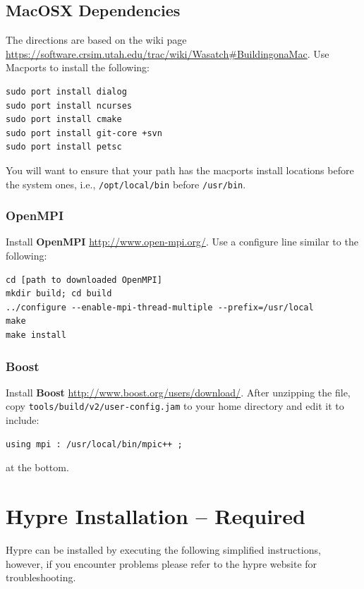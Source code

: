 \documentclass[12pt]{article}
\begin{document}
\subsection{MacOSX  Dependencies}

The directions are based on the wiki page
\url{https://software.crsim.utah.edu/trac/wiki/Wasatch#BuildingonaMac}. Use
Macports to install the following:
\begin{verbatim}
sudo port install dialog 
sudo port install ncurses
sudo port install cmake 
sudo port install git-core +svn
sudo port install petsc
\end{verbatim}
You will want to ensure that your path has the macports install
locations before the system ones, i.e., \texttt{/opt/local/bin} before
\texttt{/usr/bin}.

\subsubsection{OpenMPI}

Install \textbf{OpenMPI} \url{http://www.open-mpi.org/}.  Use a
configure line similar to the following:

\begin{verbatim}
cd [path to downloaded OpenMPI]
mkdir build; cd build
../configure --enable-mpi-thread-multiple --prefix=/usr/local
make
make install
\end{verbatim}

\subsubsection{Boost}

Install \textbf{Boost} \url{http://www.boost.org/users/download/}.
After unzipping the file, copy \texttt{tools/build/v2/user-config.jam}
to your home directory and edit it to include:
\begin{verbatim}
using mpi : /usr/local/bin/mpic++ ;
\end{verbatim}
at the bottom.





\section{Hypre Installation -- Required}

Hypre can be installed by executing the following simplified
instructions, however, if you encounter problems please refer to the
hypre website for troubleshooting.
\end{document}
